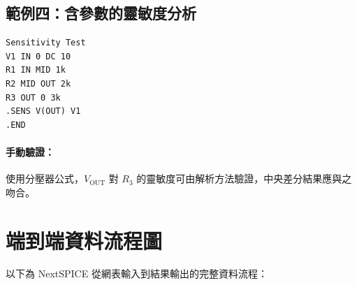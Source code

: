 \documentclass[12pt,a4paper]{article}
\begin{document}
\subsection{範例四：含參數的靈敏度分析}

\begin{lstlisting}[language=SPICE,caption={靈敏度分析}]
Sensitivity Test
V1 IN 0 DC 10
R1 IN MID 1k
R2 MID OUT 2k
R3 OUT 0 3k
.SENS V(OUT) V1
.END
\end{lstlisting}

\paragraph{手動驗證：}
使用分壓器公式，$V_{\text{OUT}}$ 對 $R_3$ 的靈敏度可由解析方法驗證，中央差分結果應與之吻合。


\section{端到端資料流程圖}

以下為 NextSPICE 從網表輸入到結果輸出的完整資料流程：
\end{document}
